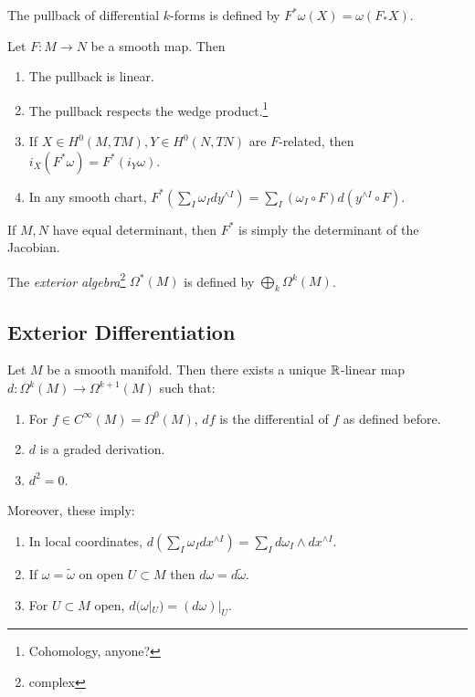 \documentclass[twoside, 10pt]{article}
\begin{document}
    \begin{defn}
        The pullback of differential $k$-forms is defined by $F^*\omega (X) = \omega (F_*X)$.
    \end{defn}

    \begin{lem}
        Let $F:M \to N$ be a smooth map. Then
        \begin{enumerate}
            \item The pullback is linear.
            \item The pullback respects the wedge product.\footnote{Cohomology, anyone?}
            \item If $X \in H^0(M,TM), Y \in H^0(N,TN)$ are $F$-related, then $i_X(F^*\omega) = F^*(i_Y \omega)$.
            \item In any smooth chart, $F^*(\sum_I \omega_I dy^{\wedge I}) = \sum_I (\omega_I \circ F) d(y^{\wedge I} \circ F)$.
        \end{enumerate}
    \end{lem}

    \begin{prop}
        If $M,N$ have equal determinant, then $F^*$ is simply the determinant of the Jacobian.
    \end{prop}

    \begin{defn}
        The \textit{exterior algebra}\footnote{complex} $\Omega^*(M)$ is defined by $\bigoplus_k \Omega^k(M)$.
    \end{defn}

    \subsection{Exterior Differentiation}%
    \label{sub:exterior_differentiation}
    
    \begin{thm}
        Let $M$ be a smooth manifold. Then there exists a unique $\mathbb{R}$-linear map $d: \Omega^k(M) \to \Omega^{k+1}(M)$ such that:
        \begin{enumerate}
            \item For $f \in C^{\infty}(M) = \Omega^0(M)$, $df$ is the differential of $f$ as defined before.
            \item $d$ is a graded derivation.
            \item $d^2 = 0$.
        \end{enumerate}
        Moreover, these imply:
        \begin{enumerate}[label=(\alph*)]
            \item In local coordinates, $d \left( \sum_I \omega_I dx^{\wedge I} \right) = \sum_I d\omega_I \wedge dx^{\wedge I}$.
            \item If $\omega = \widetilde{\omega}$ on open $U \subset M$ then $d\omega = d\widetilde{\omega}$.
            \item For $U \subset M$ open, $d(\omega |_U) = (d\omega)|_U$.
        \end{enumerate}
    \end{thm}
    
\end{document}
